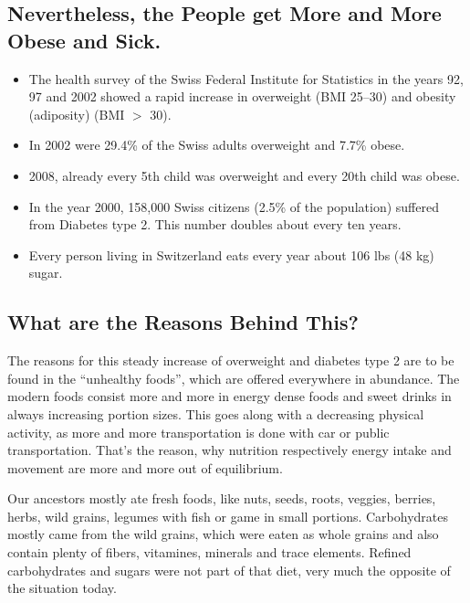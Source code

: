 \documentclass[../main.tex]{subfiles}
\begin{document}
  \subsection[Nevertheless, the People get More Obese and Sick]{Nevertheless, the People get More and More Obese and Sick.}

  \begin{itemize}
  \item The health survey of the Swiss Federal Institute for Statistics in the years 92, 97 and 2002
    showed a rapid increase in overweight (BMI 25--30) and obesity (adiposity) (BMI $>$ 30).
  \item In 2002 were 29.4\% of the Swiss adults overweight and 7.7\% obese.
  \item 2008, already every 5th child was overweight and every 20th child was obese.
  \item In the year 2000, 158,000 Swiss citizens (2.5\% of the population) suffered from Diabetes type 2. This number doubles about every ten years.
  \item Every person living in Switzerland eats every year about 106 lbs (48 kg) sugar.
  \end{itemize}

\subsection{What are the Reasons Behind This?}  

The reasons for this steady increase of overweight
and diabetes type 2
  are to be found in the ``unhealthy foods'',
which are offered everywhere in abundance.
The modern foods consist more and more in energy dense foods and sweet drinks in always increasing portion sizes.
This goes along with a decreasing physical activity, as more and more transportation is done with car or public transportation.
That's the reason, why nutrition respectively energy intake and movement are more and more out of equilibrium.

Our ancestors mostly ate fresh foods, like nuts, seeds, roots, veggies, berries, herbs, wild grains,
legumes with fish or game in small portions.
Carbohydrates mostly came from the wild grains, which were eaten as whole grains and also contain plenty
of fibers, vitamines, minerals and trace elements.
Refined carbohydrates and sugars were not part of that diet, very much the opposite of the situation today.
\end{document}
